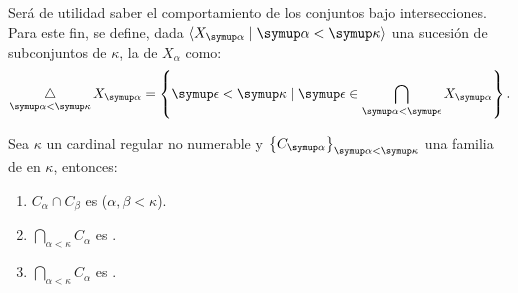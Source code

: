 Será de utilidad saber el comportamiento de los conjuntos \cna{} bajo intersecciones.
Para este fin, se define, dada $\op{X_\alpha\mid \alpha<\kappa}$ una sucesión
de subconjuntos de $\kappa$, la  de
$X_\alpha$ como:
\[
    \dint_{\alpha<\kappa}X_\alpha
    =
    \set{\epsilon<\kappa\mid\epsilon\in \bigcap_{\alpha<\epsilon}X_\alpha} .
\]

\begin{teo}\label{teo:intersection-cna}
    Sea $\kappa$ un cardinal regular no numerable y $\set{C_\alpha}_{\alpha<\kappa}$ una familia
    de \cna{} en $\kappa$, entonces:
    \begin{enumerate}[label=(\roman*)]
        \item $C_\alpha\cap C_\beta$ es \cna{} ($\alpha,\beta < \kappa$).
        \item $\bigcap_{\alpha<\kappa}C_\alpha$ es \cna.
        \item $\dint_{\alpha<\kappa}C_\alpha$ es \cna.
    \end{enumerate}
\end{teo}

